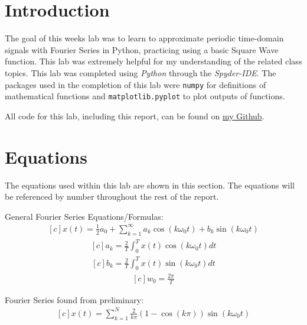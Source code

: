 \documentclass[12pt]{report}
\begin{document}
\section{Introduction}
The goal of this weeks lab was to learn to approximate periodic time-domain signals with Fourier Series in Python, practicing using a basic Square Wave function. 
This lab was extremely helpful for my understanding of the related class topics. This lab was completed using \textit{Python} through the \textit{Spyder-IDE}. The 
packages used in the completion of this lab were \texttt{numpy} for definitions of mathematical functions and \texttt{matplotlib.pyplot} to plot outputs of functions.

All code for this lab, including this report, can be found on \href{http://github.com/mac-edmondson}{my Github}.
\section{Equations}\label{section: eq}
The equations used within this lab are shown in this section. The equations will be referenced by number throughout the rest of the report.

General Fourier Series Equations/Formulas:
\begin{equation}\label{eq: ffs} %
  \begin{aligned}[c]
    x(t) = \frac{1}{2}a_0 + \sum_{k=1}^{\infty}{a_k \cos(k\omega_0t) + b_k \sin(k\omega_0t)}
  \end{aligned}
\end{equation}
\begin{equation}\label{eq: ak}
  \begin{aligned}[c]
    a_k = \frac{2}{T} \int_0^T{x(t)\cos(k\omega_0t)dt}
  \end{aligned}
\end{equation}
\begin{equation}\label{eq: bk}
  \begin{aligned}[c]
    b_k = \frac{2}{T} \int_0^T{x(t)\sin(k\omega_0t)dt}
  \end{aligned}
\end{equation}
\begin{equation}\label{eq: w0}
  \begin{aligned}[c]
    w_0 = \frac{2\pi}{T}
  \end{aligned}
\end{equation}

Fourier Series found from preliminary:
\begin{equation}\label{eq: plfs} %
  \begin{aligned}[c]
    x(t) = \sum_{k=1}^{N}{\frac{2}{k\pi}(1 - \cos(k \pi))\sin(k\omega_0t)}
  \end{aligned}
\end{equation}
\end{document}
